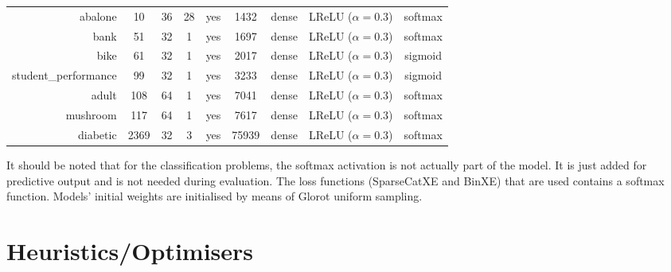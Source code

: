 \begin{table}[htbp]
{\begin{tabular}{rcccccccc}
                  abalone              & 10              & 36              & 28              & yes             & 1432                & dense             & LReLU ($\alpha = 0.3$) & softmax                \\
                  bank                 & 51              & 32              & 1               & yes             & 1697                & dense             & LReLU ($\alpha = 0.3$) & softmax                \\
                  bike                 & 61              & 32              & 1               & yes             & 2017                & dense             & LReLU ($\alpha = 0.3$) & sigmoid                \\
                  student\_performance & 99              & 32              & 1               & yes             & 3233                & dense             & LReLU ($\alpha = 0.3$) & sigmoid                \\
                  adult                & 108             & 64              & 1               & yes             & 7041                & dense             & LReLU ($\alpha = 0.3$) & softmax                \\
                  mushroom             & 117             & 64              & 1               & yes             & 7617                & dense             & LReLU ($\alpha = 0.3$) & softmax                \\
                  diabetic             & 2369            & 32              & 3               & yes             & 75939               & dense             & LReLU ($\alpha = 0.3$) & softmax                \\
            \end{tabular}%
      }
\end{table}%

It should be noted that for the classification problems, the softmax activation is not actually part of the model. It is just added for predictive output and is not needed during evaluation. The loss functions (\ac{SparseCatXE} and \ac{BinXE}) that are used contains a softmax function. Models' initial weights are initialised by means of Glorot uniform sampling.

\section{Heuristics/Optimisers}
\label{sec:methodology:heuristics}

